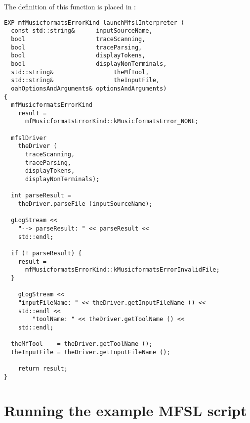 The definition of this function is placed in :
\begin{lstlisting}[language=Terminal]
EXP mfMusicformatsErrorKind launchMfslInterpreter (
  const std::string&      inputSourceName,
  bool                    traceScanning,
  bool                    traceParsing,
  bool                    displayTokens,
  bool                    displayNonTerminals,
  std::string&                 theMfTool,
  std::string&                 theInputFile,
  oahOptionsAndArguments& optionsAndArguments)
{
  mfMusicformatsErrorKind
    result =
      mfMusicformatsErrorKind::kMusicformatsError_NONE;

  mfslDriver
    theDriver (
      traceScanning,
      traceParsing,
      displayTokens,
      displayNonTerminals);

  int parseResult =
  	theDriver.parseFile (inputSourceName);

  gLogStream <<
    "--> parseResult: " << parseResult <<
    std::endl;

  if (! parseResult) {
    result =
      mfMusicformatsErrorKind::kMusicformatsErrorInvalidFile;
  }

	gLogStream <<
    "inputFileName: " << theDriver.getInputFileName () <<
  	std::endl <<
		"toolName: " << theDriver.getToolName () <<
  	std::endl;

  theMfTool    = theDriver.getToolName ();
  theInputFile = theDriver.getInputFileName ();

	return result;
}
\end{lstlisting}


\section{Running the example MFSL script}

